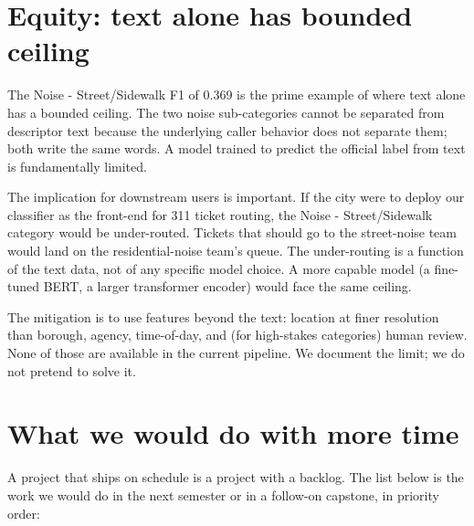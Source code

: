 \documentclass[11pt,letterpaper]{book}
\begin{document}
\section{Equity: text alone has bounded ceiling}

The Noise - Street/Sidewalk F1 of 0.369 is the prime example of where text alone has a bounded ceiling. The two noise sub-categories cannot be separated from descriptor text because the underlying caller behavior does not separate them; both write the same words. A model trained to predict the official label from text is fundamentally limited.

The implication for downstream users is important. If the city were to deploy our classifier as the front-end for 311 ticket routing, the Noise - Street/Sidewalk category would be under-routed. Tickets that should go to the street-noise team would land on the residential-noise team's queue. The under-routing is a function of the text data, not of any specific model choice. A more capable model (a fine-tuned BERT, a larger transformer encoder) would face the same ceiling.

The mitigation is to use features beyond the text: location at finer resolution than borough, agency, time-of-day, and (for high-stakes categories) human review. None of those are available in the current pipeline. We document the limit; we do not pretend to solve it.

\section{What we would do with more time}

A project that ships on schedule is a project with a backlog. The list below is the work we would do in the next semester or in a follow-on capstone, in priority order:
\end{document}
